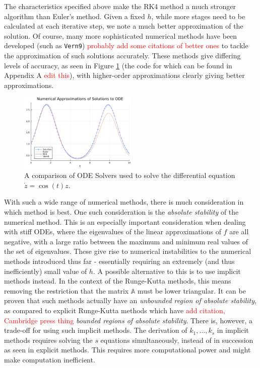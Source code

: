 \documentclass[a4paper,11pt,titlepage]{article}
\theoremstyle{definition}
\theoremstyle{plain}
\theoremstyle{remark}
\begin{document}
The characteristics specified above make the RK4 method a much stronger algorithm than Euler's method. Given a fixed $h$, while more stages need to be calculated at each iterative step, we note a much better approximation of the solution. Of course, many more sophisticated numerical methods have been developed (such as \texttt{Vern9}) \textcolor{red}{probably add some citations of better ones} to tackle the approximation of such solutions accurately. These methods give differing levels of accuracy, as seen in Figure \ref{fig:odesolver} (the code for which can be found in Appendix A \textcolor{red}{edit this}), with higher-order approximations clearly giving better approximations.

\begin{figure}
    \centering
    \includegraphics[width=0.5\textwidth]{report/figures/ODESolvers.png}
    \caption{A comparison of ODE Solvers used to solve the differential equation $\dot{z} = \cos(t)z$.}
    \label{fig:odesolver}
\end{figure}

With such a wide range of numerical methods, there is much consideration in which method is best. One such consideration is the \textit{absolute stability} of the numerical method. This is an especially important consideration when dealing with stiff ODEs, where the eigenvalues of the linear approximations of $f$ are all negative, with a large ratio between the maximum and minimum real values of the set of eigenvalues. These give rise to numerical instabilities to the numerical methods introduced thus far - essentially requiring an extremely (and thus inefficiently) small value of $h$. A possible alternative to this is to use implicit methods instead. In the context of the Runge-Kutta methods, this means removing the restriction that the matrix $\mathbb{A}$ must be lower triangular. It can be proven that such methods actually have an \textit{unbounded region of absolute stability}, as compared to explicit Runge-Kutta methods which have \textcolor{red}{add citation, Cambridge press thing} \textit{bounded regions of absolute stability}. There is, however, a trade-off for using such implicit methods. The derivation of $k_1, \dots, k_s$ in implicit methods requires solving the $s$ equations simultaneously, instead of in succession as seen in explicit methods. This requires more computational power and might make computation inefficient.
\end{document}
